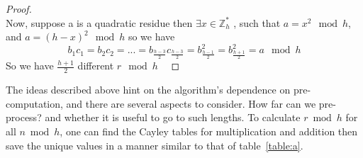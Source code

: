 \documentclass{article}
\begin{document}
{\begin{proof}
\\
Now, suppose a is a quadratic residue then $\exists x \in \mathbb{Z}_h^*$ , such that $a = x^2 \mod h$, 
and $a = (h-x)^2 \mod h$ so we have 
$$b_1 c_1 = b_2 c_2 = ... = b_{\frac{h-3}{2}} c_{\frac{h-3}{2}} = b_{\frac{h-1}{2}}^2 =  b_{\frac{h+1}{2}}^2 = a \mod h$$
So we have $\frac{h+1}{2}$ different $r \mod h$
\
\end{proof}
			The ideas described above hint on the algorithm's dependence on pre-computation, 
			and there are several aspects to consider.
			How far can we pre-process? and whether it is useful to go to such lengths. 
            To calculate $r \bmod h$ for all $n \bmod h$, one can find the Cayley tables for multiplication and addition then save the unique values in a manner similar to that of table~\ref{table:a}. 
}
\end{document}
